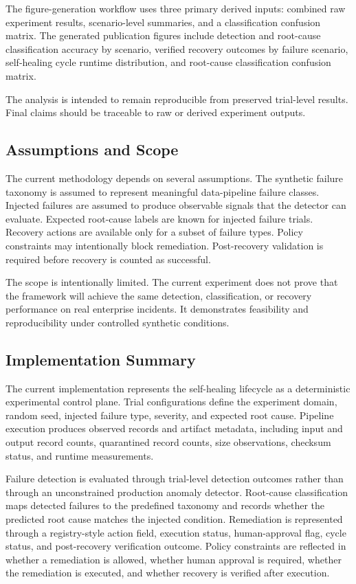 The figure-generation workflow uses three primary derived inputs: combined raw experiment results, scenario-level summaries, and a classification confusion matrix. The generated publication figures include detection and root-cause classification accuracy by scenario, verified recovery outcomes by failure scenario, self-healing cycle runtime distribution, and root-cause classification confusion matrix.

The analysis is intended to remain reproducible from preserved trial-level results. Final claims should be traceable to raw or derived experiment outputs.

\subsection{Assumptions and Scope}


The current methodology depends on several assumptions. The synthetic failure taxonomy is assumed to represent meaningful data-pipeline failure classes. Injected failures are assumed to produce observable signals that the detector can evaluate. Expected root-cause labels are known for injected failure trials. Recovery actions are available only for a subset of failure types. Policy constraints may intentionally block remediation. Post-recovery validation is required before recovery is counted as successful.

The scope is intentionally limited. The current experiment does not prove that the framework will achieve the same detection, classification, or recovery performance on real enterprise incidents. It demonstrates feasibility and reproducibility under controlled synthetic conditions.

\subsection{Implementation Summary}


The current implementation represents the self-healing lifecycle as a deterministic experimental control plane. Trial configurations define the experiment domain, random seed, injected failure type, severity, and expected root cause. Pipeline execution produces observed records and artifact metadata, including input and output record counts, quarantined record counts, size observations, checksum status, and runtime measurements.

Failure detection is evaluated through trial-level detection outcomes rather than through an unconstrained production anomaly detector. Root-cause classification maps detected failures to the predefined taxonomy and records whether the predicted root cause matches the injected condition. Remediation is represented through a registry-style action field, execution status, human-approval flag, cycle status, and post-recovery verification outcome. Policy constraints are reflected in whether a remediation is allowed, whether human approval is required, whether the remediation is executed, and whether recovery is verified after execution.

